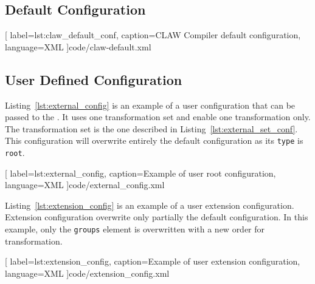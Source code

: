 \subsection{Default Configuration}

  [
    label=lst:claw_default_conf,
    caption=CLAW Compiler default configuration,
    language=XML
  ]{code/claw-default.xml}

\subsection{User Defined Configuration}
Listing~\ref{lst:external_config} is an example of a user configuration that
can be passed to the \clawfcomp. It uses one transformation set and enable
one transformation only. The transformation set is the one described in 
Listing~\ref{lst:external_set_conf}. This configuration will overwrite 
entirely the default configuration as its \lstinline!type! is \lstinline!root!.


  [
    label=lst:external_config,
    caption=Example of user root configuration,
    language=XML
  ]{code/external_config.xml}

Listing~\ref{lst:extension_config} is an example of a user extension 
configuration. Extension configuration overwrite only partially the default 
configuration. In this example, only the \lstinline!groups! element is 
overwritten with a new order for transformation.


  [
    label=lst:extension_config,
    caption=Example of user extension configuration,
    language=XML
  ]{code/extension_config.xml}